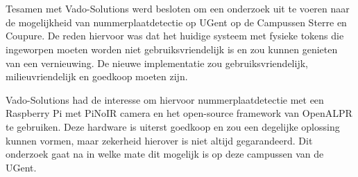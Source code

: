 
%
%




\chapter*{}

Tesamen met Vado-Solutions werd besloten om een onderzoek uit te voeren naar de mogelijkheid van nummerplaatdetectie op UGent op de Campussen Sterre en Coupure. De reden hiervoor was dat het huidige systeem met fysieke tokens die ingeworpen moeten worden niet gebruiksvriendelijk is en zou kunnen genieten van een vernieuwing. De nieuwe implementatie zou gebruiksvriendelijk, milieuvriendelijk en goedkoop moeten zijn.

Vado-Solutions had de interesse om hiervoor nummerplaatdetectie met een Raspberry Pi met PiNoIR camera en het open-source framework van OpenALPR te gebruiken. Deze hardware is uiterst goedkoop en zou een degelijke oplossing kunnen vormen, maar zekerheid hierover is niet altijd gegarandeerd. Dit onderzoek gaat na in welke mate dit mogelijk is op deze campussen van de UGent.

